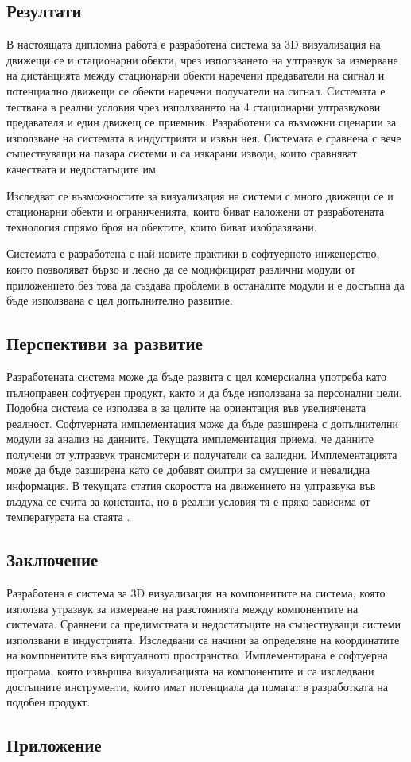 \subsection{Резултати}

В настоящата дипломна работа е разработена система за 3D визуализация на движещи се и стационарни обекти, чрез използването на ултразвук за измерване на дистанцията между стационарни обекти наречени предаватели на сигнал и потенциално движещи се обекти наречени получатели на сигнал. Системата е тествана в реални условия чрез използването на 4 стационарни ултразвукови предавателя и един движещ се приемник. Разработени са възможни сценарии за използване на системата в индустрията и извън нея. Системата е сравнена с вече съществуващи на пазара системи и са изкарани изводи, които сравняват качествата и недостатъците им.

Изследват се възможностите за визуализация на системи с много движещи се и стационарни обекти и ограниченията, които биват наложени от разработената технология спрямо броя на обектите, които биват изобразявани.

Системата е разработена с най-новите практики в софтуерното инженерство, които позволяват бързо и лесно да се модифицират различни модули от приложението без това да създава проблеми в останалите модули и е достъпна да бъде използвана с цел допълнително развитие.

\subsection{Перспективи за развитие}
Разработената система може да бъде развита с цел комерсиална употреба като пълноправен софтуерен продукт, както и да бъде използвана за персонални цели. Подобна система се използва в \cite{vr} за целите на ориентация във увелиячената реалност. Софтуерната имплементация може да бъде разширена с допълнителни модули за анализ на данните. Текущата имплементация приема, че данните получени от ултразвук трансмитери и получатели са валидни. Имплементацията може да бъде разширена като се добавят филтри за смущение и невалидна информация. В текущата статия скоростта на движението на ултразвука във въздуха се счита за константа, но в реални условия тя е пряко зависима от температурата на стаята \cite{vr}.

\subsection{Заключение}
Разработена е система за 3D визуализация на компонентите на система, която използва утразвук за измерване на разстоянията между компонентите на системата. Сравнени са предимствата и недостатъците на съществуващи системи използвани в индустрията. Изследвани са начини за определяне на координатите на компонентите във виртуалното пространство. Имплементирана е софтуерна програма, която извършва визуализацията на компонентите и са изследвани достъпните инструменти, които имат потенциала да помагат в разработката на подобен продукт.

\subsection{Приложение}

